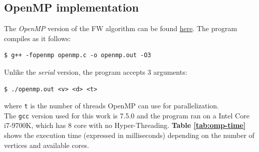 \subsection{OpenMP implementation}\label{ompimpl}
The \emph{OpenMP} version of the FW algorithm can be found \href{https://github.com/firaja/Parallel-FloydWarshall/blob/master/openmp.c}{here}. 
The program compiles as it follows:
\begin{lstlisting}[basicstyle=\footnotesize\ttfamily]
$ g++ -fopenmp openmp.c -o openmp.out -O3
\end{lstlisting}
Unlike the \emph{serial} version, the program accepts 3 arguments:
\begin{lstlisting}[basicstyle=\footnotesize\ttfamily]
$ ./openmp.out <v> <d> <t>
\end{lstlisting}
where \texttt{t} is the number of threads OpenMP can use for parallelization. \\
The \texttt{gcc} version used for this work is 7.5.0 and the program ran on a Intel Core i7-9700K, which has 8 core with no Hyper-Threading.
\textbf{Table \ref*{tab:omp-time}} shows the execution time (expressed in milliseconds) depending on the number of vertices and available cores.

